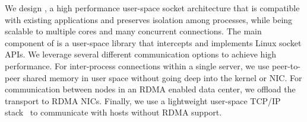 


We design \sys{}, a high performance user-space socket architecture that is compatible with existing applications and preserves isolation among processes, while being scalable to multiple cores and many concurrent connections. The main component of \sys{} is a user-space library \libipc{} that intercepts and implements Linux socket APIs. We leverage several different communication options to achieve high performance. For inter-process connections within a single server, we use peer-to-peer shared memory in user space without going deep into the kernel or NIC. For communication between nodes in an RDMA enabled data center, we offload the transport to RDMA NICs. Finally, we use a lightweight user-space TCP/IP stack~\cite{dunkels2001design} to communicate with hosts without RDMA support.

